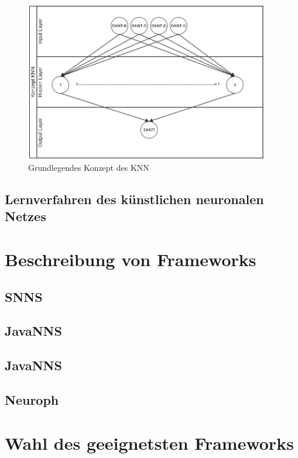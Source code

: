 \begin{figure}[H]
\centering
		\includegraphics[width=0.95\textwidth]{KonzeptKNN.PNG}
	\caption{Grundlegendes Konzept des KNN}
	\label{fig:Grundlegendes Konzept des KNN}
\end{figure}

\subsection{Lernverfahren des künstlichen neuronalen Netzes} 
\label{subsection:Lernverfahren des künstlichen neuronalen Netzes} 

\section{Beschreibung von Frameworks} %
\label{section:Beschreibung von Frameworks} %

\subsection{SNNS} %
\label{subsection:SNNS} %

\subsection{JavaNNS}  %
\subsection{JavaNNS}  %

\subsection{Neuroph} %
\label{subsection:Neuroph} %

\section{Wahl des geeignetsten Frameworks} %
\label{section:Wahl des geeignetsten Frameworks} %

